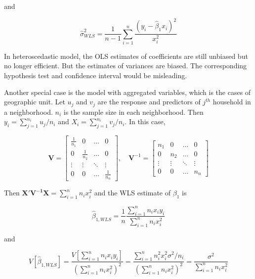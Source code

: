 \documentclass[
  11pt,
  openany]{memoir}
\begin{document}
and

\begin{equation}
\hat\sigma^2_{WLS}=\frac1{n-1}\sum_{i=1}^{n}\frac{(y_i-\hat\beta_{1}x_i)^2}{x_i^2}
\label{eq:hete-v}
\end{equation}

In heteroscedastic model, the OLS estimates of coefficients are still unbiased but no longer efficient.
But the estimates of variances are biased. The corresponding hypothesis test and confidence interval would be misleading.

Another special case is the model with aggregated variables, which is the cases of geographic unit.
Let \(u_j\) and \(v_j\) are the response and predictors of \(j^{th}\) household in a neighborhood. \(n_i\) is the sample size in each neighborhood. Then \(y_i=\sum_{j=1}^{n_i}u_j/n_i\) and \(X_i=\sum_{j=1}^{n_i}v_j/n_i\). In this case,

\begin{equation}
\mathbf{V}=\begin{bmatrix} 
\frac1{n_1} & 0 & \dots & 0 \\  
0 & \frac1{n_2} & \dots & 0 \\  
\vdots & \vdots & \ddots & \vdots \\  
0 & 0 & \dots & \frac1{n_n} \end{bmatrix},\quad 
\mathbf{V}^{-1}=\begin{bmatrix} 
n_1 & 0 & \dots & 0 \\  
0 & n_2 & \dots & 0 \\  
\vdots & \vdots & \ddots & \vdots \\  
0 & 0 & \dots & n_n \end{bmatrix}
\label{eq:agg-matrix}
\end{equation}

Then \(\mathbf{X'V^{-1}X}=\sum_{i=1}^nn_ix_i^2\) and the WLS estimate of \(\beta_1\) is

\begin{equation}
\hat\beta_{1,WLS}=\frac1n\frac{\sum_{i=1}^{n}n_ix_iy_i}{\sum_{i=1}^{n}n_ix_i^2}
\label{eq:agg-e}
\end{equation}

and

\begin{equation}
V[\hat\beta_{1,WLS}]=\frac{V[\sum_{i=1}^{n}n_ix_iy_i]}{(\sum_{i=1}^{n}n_ix_i^2)^2}=\frac{\sum_{i=1}^{n}n_i^2x_i^2\sigma^2/n_i}{(\sum_{i=1}^{n}n_ix_i^2)^2}=\frac{\sigma^2}{\sum_{i=1}^{n}n_ix_i^2}
\label{eq:agg-v}
\end{equation}
\end{document}
